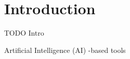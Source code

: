 
\chapter{Introduction}
\label{ch:introduction}

TODO Intro

Artificial Intelligence (AI) -based tools
%
%
%
%
%

